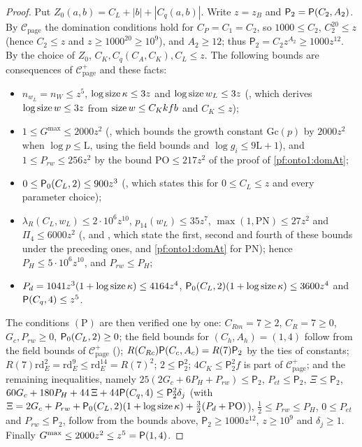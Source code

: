 \begin{proof}
Put $Z_0(a,b)=C_L+|b|+|C_q(a,b)|$. Write $z=z_B$ and $\mathsf P_2=\mathsf{P}(C_2,A_2)$. By $\mathcal C_{\mathrm{page}}$ the domination
conditions hold for $C_P=C_1=C_2$, so $1000\le C_2$, $C_2^{20}\le z$ (hence $C_2\le z$ and $z\ge1000^{20}\ge10^9$), and $A_2\ge12$;
thus $\mathsf P_2=C_2z^{A_2}\ge1000z^{12}$. By the choice of $Z_0$, $C_K,C_q(C_A,C_K),C_L\le z$. The following bounds are
consequences of $\mathcal C^+_{\mathrm{page}}$ and these facts:
\begin{itemize}
\item $n_{w_L}=n_W\le z^5$, $\log\operatorname{size}\kappa\le3z$ and $\log\operatorname{size} w_L\le3z$
(, which derives $\log\operatorname{size} w\le3z$ from $\operatorname{size} w\le C_Kkfb$ and $C_K\le z$);
\item $1\le G^{\max}\le2000z^2$ (, which bounds the growth constant $\mathrm{Gc}(p)$ by
$2000z^2$ when $\log p\le\mathrm L$, using the field bounds and $\log g_i\le9\mathrm L+1$), and $1\le P_{rw}\le256z^2$ by the bound
$\mathrm{PO}\le217z^2$ of the proof of \cref{pf:onto1:domAt};
\item $0\le\mathsf{P}_0(C_L,2)\le900z^3$ (, which states this for
$0\le C_L\le z$ and every parameter choice);
\item $\lambda_R(C_L,w_L)\le2\cdot10^6z^{10}$, $p_{14}(w_L)\le35z^7$, $\max(1,\mathrm{PN})\le27z^2$ and $\Pi_4\le6000z^2$
(,  and
, which state the first, second and fourth of these bounds under
the preceding ones, and \cref{pf:onto1:domAt} for $\mathrm{PN}$); hence $P_H\le5\cdot10^6z^{10}$, and $P_{rw}\le P_H$;
\item $P_d=1041z^3(1+\log\operatorname{size}\kappa)\le4164z^4$, $\mathsf{P}_0(C_L,2)(1+\log\operatorname{size}\kappa)\le3600z^4$ and
$\mathsf{P}(C_q,4)\le z^5$.
\end{itemize}
The conditions $(\mathrm P)$ are then verified one by one: $C_{Rm}=7\ge2$, $C_R=7\ge0$, $G_c,P_{rw}\ge0$, $\mathsf{P}_0(C_L,2)\ge0$; the
field bounds for $(C_h,A_h)=(1,4)$ follow from the field bounds of $\mathcal C^+_{\mathrm{page}}$ ();
$R(C_{Rc})\mathsf{P}(C_c,A_c)=R(7)\mathsf P_2$ by the ties of constants; $R(7)\mathrm{rd}_E^2=\mathrm{rd}_E^9\le\mathrm{rd}_E^{14}=R(7)^2$;
$2\le\mathsf P_2^2$; $4C_K\le\mathsf P_2^2f$ is part of $\mathcal C^+_{\mathrm{page}}$; and the remaining inequalities, namely
$25(2G_c+6P_H+P_{rw})\le\mathsf P_2$, $P_{et}\le\mathsf P_2$, $\Xi\le\mathsf P_2$, $60G_c+180P_H+44\,\Xi+44\mathsf{P}(C_q,4)\le
\mathsf P_2^2\delta_j$ (with $\Xi=2G_c+P_{rw}+\mathsf{P}_0(C_L,2)(1+\log\operatorname{size}\kappa)+\frac32(P_d+\mathrm{PO})$), $\frac12\le P_{rw}\le P_H$,
$0\le P_{et}$ and $P_{rw}\le\mathsf P_2$, follow from the bounds above, $\mathsf P_2\ge1000z^{12}$, $z\ge10^9$ and $\delta_j\ge1$. Finally
$G^{\max}\le2000z^2\le z^5=\mathsf{P}(1,4)$.
\end{proof}
